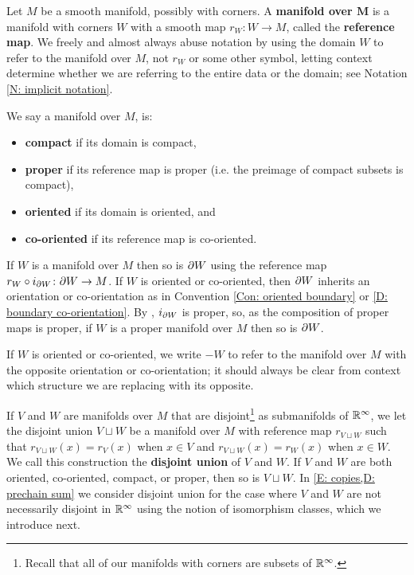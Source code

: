 \begin{definition}\label{V: maps are co-oriented}
	Let $M$ be a smooth manifold, possibly with corners.
	A \textbf{manifold over $\mathbf{M}$} is a manifold with corners $W$ with a smooth map $r_W \colon W \to M$,
	called the \textbf{reference map}.
	We freely and almost always abuse notation
	by using the domain $W$ to refer to the manifold over $M$, not $r_W$ or some other symbol, letting
	context determine whether we are referring to the entire data or the domain; see Notation \ref{N: implicit notation}.

	We say a manifold over $M$, is:
	\begin{itemize}
		\item \textbf{compact} if its domain is compact,
		\item \textbf{proper} if its reference map is proper (i.e. the preimage of compact subsets is compact),
		\item \textbf{oriented} if its domain is oriented, and
		\item \textbf{co-oriented} if its reference map is co-oriented.
	\end{itemize}
	If $W$ is a manifold over $M$ then so is $\partial W$ using the reference map $r_W \circ i_{\partial W} \colon \partial W \to M$.
	If \(W\) is oriented or co-oriented, then \(\partial W\) inherits an orientation or co-orientation as in Convention \ref{Con: oriented boundary} or \cref{D: boundary co-orientation}.
	By \cite[Lemma 2.8]{Joy12}, $i_{\partial W}$ is proper, so, as the composition of proper maps is proper, if $W$ is a proper manifold over $M$ then so is $\partial W$.

	If $W$ is oriented or co-oriented, we write $-W$ to refer to the manifold over $M$ with the opposite orientation or co-orientation; it should always be clear from context which structure we are replacing with its opposite.

	If $V$ and $W$ are manifolds over $M$ that are disjoint\footnote{Recall that all of our manifolds with corners are subsets of $\mathbb{R}^\infty$.} as submanifolds of $\mathbb{R}^\infty$, we let the disjoint union $V \sqcup W$ be a manifold over $M$ with reference map $r_{V \sqcup W}$ such that $r_{V \sqcup W}(x) = r_V(x)$ when $x \in V$ and $r_{V \sqcup W}(x) = r_W(x)$ when $x \in W$.
	We call this construction the \textbf{disjoint union} of $V$ and $W$.
	If $V$ and $W$ are both oriented, co-oriented, compact, or proper, then so is $V \sqcup W$.
	In \cref{E: copies,D: prechain sum} we consider disjoint union for the case where $V$ and $W$ are not necessarily disjoint in $\mathbb{R}^\infty$ using the notion of isomorphism classes, which we introduce next.
\end{definition}

